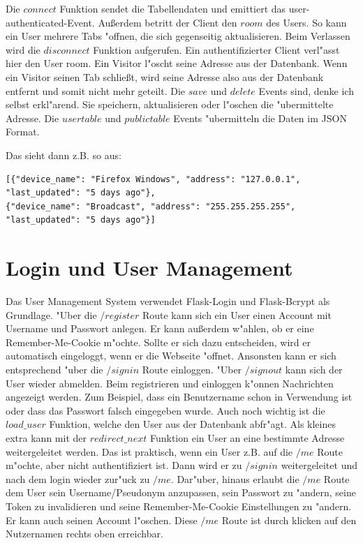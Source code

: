 Die $connect$ Funktion sendet die Tabellendaten und emittiert das user-authenticated-Event.
Au\ss erdem betritt der Client den $room$ des Users.
So kann ein User mehrere Tabs {"o}ffnen, die sich gegenseitig aktualisieren.
Beim Verlassen wird die $disconnect$ Funktion aufgerufen.
Ein authentifizierter Client verl{"a}sst hier den User room.
Ein Visitor l{"o}scht seine Adresse aus der Datenbank.
Wenn ein Visitor seinen Tab schlie\ss t, wird seine Adresse also aus der Datenbank entfernt und somit nicht mehr geteilt.
Die $save$ und $delete$ Events sind, denke ich selbst erkl{"a}rend.
Sie speichern, aktualisieren oder l{"o}schen die {"u}bermittelte Adresse.
Die $user table$ und $public table$ Events {"u}bermitteln die Daten im JSON Format.
\begin{samepage}
    Das sieht dann z.B. so aus:
    \begin{lstlisting}
[{"device_name": "Firefox Windows", "address": "127.0.0.1", "last_updated": "5 days ago"},
{"device_name": "Broadcast", "address": "255.255.255.255", "last_updated": "5 days ago"}]
    \end{lstlisting}
\end{samepage}


\section{Login und User Management}\label{sec:login_views}
Das User Management System verwendet Flask-Login und Flask-Bcrypt als Grundlage.
{"U}ber die $/register$ Route kann sich ein User einen Account mit Username und Passwort anlegen.
Er kann au\ss erdem w{"a}hlen, ob er eine Remember-Me-Cookie m{"o}chte.
Sollte er sich dazu entscheiden, wird er automatisch eingeloggt, wenn er die Webseite {"o}ffnet.
Ansonsten kann er sich entsprechend {"u}ber die $/signin$ Route einloggen.
{"U}ber $/signout$ kann sich der User wieder abmelden.
Beim registrieren und einloggen k{"o}nnen Nachrichten angezeigt werden.
Zum Beispiel, dass ein Benutzername schon in Verwendung ist oder dass das Passwort falsch eingegeben wurde.
Auch noch wichtig ist die $load\_user$ Funktion, welche den User aus der Datenbank abfr{"a}gt.
Als kleines extra kann mit der $redirect\_next$ Funktion ein User an eine bestimmte Adresse weitergeleitet werden.
Das ist praktisch, wenn ein User z.B. auf die $/me$ Route m{"o}chte, aber nicht authentifiziert ist.
Dann wird er zu $/signin$ weitergeleitet und nach dem login wieder zur{"u}ck zu $/me$.
Dar{"u}ber, hinaus erlaubt die $/me$ Route dem User sein Username/Pseudonym anzupassen,
sein Passwort zu {"a}ndern, seine Token zu invalidieren und seine Remember-Me-Cookie Einstellungen zu {"a}ndern.
Er kann auch seinen Account l{"o}schen.
Diese $/me$ Route ist durch klicken auf den Nutzernamen rechts oben erreichbar.

